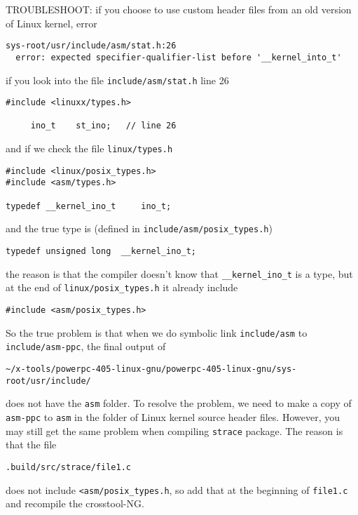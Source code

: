 TROUBLESHOOT: if you choose to use custom header files from an old version of Linux kernel, error
\begin{verbatim}
sys-root/usr/include/asm/stat.h:26
  error: expected specifier-qualifier-list before '__kernel_into_t'
\end{verbatim}
if you look into the file \verb!include/asm/stat.h! line 26
\begin{verbatim}
#include <linuxx/types.h>

     ino_t    st_ino;   // line 26
\end{verbatim}
and if we check the file \verb!linux/types.h!
\begin{verbatim}
#include <linux/posix_types.h>
#include <asm/types.h>

typedef __kernel_ino_t     ino_t;
\end{verbatim}
and the true type is (defined in \verb!include/asm/posix_types.h!)
\begin{verbatim}
typedef unsigned long  __kernel_ino_t;
\end{verbatim}
the reason is that the compiler doesn't know that \verb!__kernel_ino_t! is a type,
but at the end of \verb!linux/posix_types.h! it already include
\begin{verbatim}
#include <asm/posix_types.h>
\end{verbatim}
So the true problem is that when we do symbolic link \verb!include/asm! to
\verb!include/asm-ppc!, the final output of 
\begin{verbatim}
~/x-tools/powerpc-405-linux-gnu/powerpc-405-linux-gnu/sys-root/usr/include/
\end{verbatim}
does not have the \verb!asm! folder. To resolve the problem, we need to make a copy of
\verb!asm-ppc! to \verb!asm! in the folder of Linux kernel source header files. However, you may still
get the same problem when compiling \verb!strace! package. The reason is that the file
\begin{verbatim}
.build/src/strace/file1.c
\end{verbatim}
does not include \verb!<asm/posix_types.h!, so add that at the beginning of \verb!file1.c! 
and recompile the crosstool-NG.
 
 

